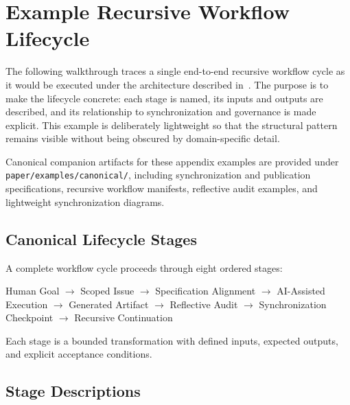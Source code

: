 %
%

\section{Example Recursive Workflow Lifecycle}
\label{sec:appendix-workflow}

The following walkthrough traces a single end-to-end recursive workflow cycle as it would be executed under the  architecture described in~. The purpose is to make the lifecycle concrete: each stage is named, its inputs and outputs are described, and its relationship to synchronization and governance is made explicit. This example is deliberately lightweight so that the structural pattern remains visible without being obscured by domain-specific detail.

Canonical companion artifacts for these appendix examples are provided under \texttt{paper/examples/canonical/}, including synchronization and publication specifications, recursive workflow manifests, reflective audit examples, and lightweight synchronization diagrams.

\subsection{Canonical Lifecycle Stages}

A complete  workflow cycle proceeds through eight ordered stages:

\begin{center}
Human Goal
$\rightarrow$ Scoped Issue
$\rightarrow$ Specification Alignment
$\rightarrow$ AI-Assisted Execution
$\rightarrow$ Generated Artifact
$\rightarrow$ Reflective Audit
$\rightarrow$ Synchronization Checkpoint
$\rightarrow$ Recursive Continuation
\end{center}

Each stage is a bounded transformation with defined inputs, expected outputs, and explicit acceptance conditions.

\subsection{Stage Descriptions}

